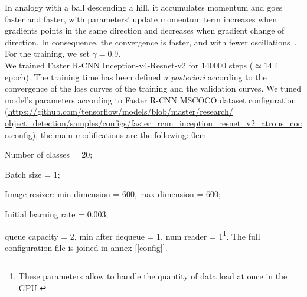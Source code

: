 \documentclass[12pt, french, a4paper]{article} %
\let\tempone\itemize
\let\temptwo\enditemize
\renewenvironment{itemize}{\tempone\addtolength{\itemsep}{-0.3\baselineskip}}{\temptwo}
\newcommand{\link}[1]{{\color{Blue}\scriptsize\href{#1}{#1}}}
\begin{document}
In analogy with a ball descending a hill, it accumulates momentum and goes faster and faster, with parameters' update momentum term increases when gradients points in the same direction and decreases when gradient change of direction. In consequence, the convergence is faster, and with fewer oscillations \cite{ruder2016overview}. For the training, we set $\gamma = 0.9$.\\
We trained Faster \gls{R-CNN} Inception-v4-Resnet-v2 for 140000 steps ($\simeq 14.4$ epoch). The training time has been defined \textit{a posteriori} according to the convergence of the loss curves of the training and the validation curves. We tuned model's parameters according to Faster \gls{R-CNN} MSCOCO dataset \cite{lin2014microsoft} configuration (\link{https://github.com/tensorflow/models/blob/master/research/\\object_detection/samples/configs/faster_rcnn_inception_resnet_v2_atrous_coco.config}), the main modifications are the following:
\begin{itemize}
\itemsep0em 
 \item Number of classes = 20;
 \item Batch size = 1;
 \item Image resizer: min dimension = 600, max dimension = 600;
 \item Initial learning rate = 0.003;
 \item queue capacity = 2, min after dequeue = 1, num reader = 1\footnote{These parameters allow to handle the quantity of data load at once in the GPU.}.
\end{itemize}
The full configuration file is joined in annex [\ref{config}].

\end{document}

